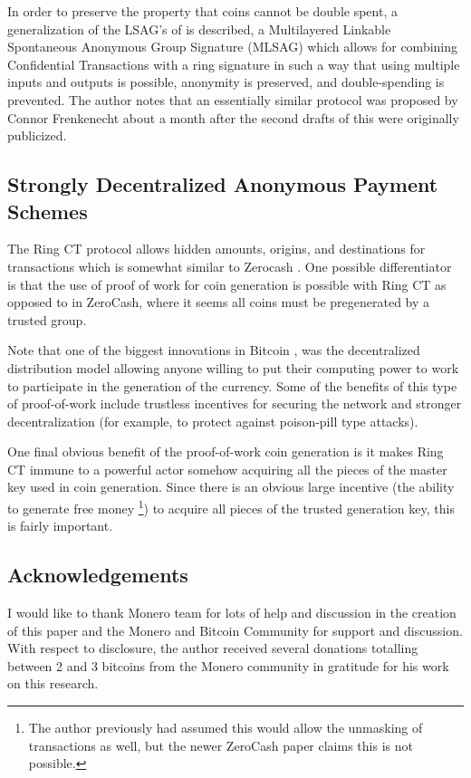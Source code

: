 \documentclass[12pt,english]{mrl}
\theoremstyle{definition}
\numberwithin{equation}{section}
\numberwithin{figure}{section}
\numberwithin{equation}{section}
\numberwithin{equation}{section}
\numberwithin{figure}{section}
\begin{document}
In order to preserve the property that coins cannot be double spent,
a generalization of the LSAG's of \cite{LWW} is described, a Multilayered Linkable
Spontaneous Anonymous Group Signature (MLSAG) which allows for combining
Confidential Transactions with a ring signature in such a way that
using multiple inputs and outputs is possible, anonymity is preserved,
and double-spending is prevented. The author notes that an essentially similar protocol was proposed by Connor Frenkenecht about a month after the second drafts of this were originally publicized. 
\subsection{Strongly Decentralized Anonymous Payment Schemes}
The Ring CT protocol allows hidden amounts, origins, and destinations
for transactions which is somewhat similar to Zerocash \cite{Z}. 
One possible differentiator is that the use of proof of work for coin generation
is possible with Ring CT as opposed to in ZeroCash, where it seems all coins
must be pregenerated by a trusted group.

Note that one of the biggest innovations in Bitcoin \cite{SN}, was
the decentralized distribution model allowing anyone willing to put
their computing power to work to participate in the generation of
the currency. Some of the benefits of this type of proof-of-work include
trustless incentives for securing the network and stronger decentralization (for example, to protect against poison-pill type attacks).  

One final obvious benefit of the proof-of-work coin generation is
it makes Ring CT immune to a powerful actor somehow acquiring all the
pieces of the master key used in coin generation. Since there is an
obvious large incentive (the ability to generate free money \footnote{The author previously had assumed this would allow the unmasking of transactions as well, but the newer ZeroCash paper claims this is not possible.}) to acquire all pieces of the trusted generation
key, this is fairly important. 


\subsection{Acknowledgements}

I would like to thank Monero team for lots of help and discussion
in the creation of this paper and the Monero and Bitcoin Community
for support and discussion. With respect to disclosure, the author received several donations totalling between 2 and 3 bitcoins from the Monero community in gratitude for his work on this research. 
\end{document}
